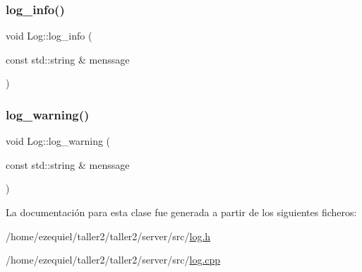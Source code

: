 \subsubsection{\texorpdfstring{log\+\_\+info()}{log\_info()}}
{\footnotesize\ttfamily void Log\+::log\+\_\+info (\begin{DoxyParamCaption}\item[{const std\+::string \&}]{menssage }\end{DoxyParamCaption})}

\mbox{\label{classLog_ac659fa24adce6d3ed79be5c6ab4248ca}} 
\subsubsection{\texorpdfstring{log\+\_\+warning()}{log\_warning()}}
{\footnotesize\ttfamily void Log\+::log\+\_\+warning (\begin{DoxyParamCaption}\item[{const std\+::string \&}]{menssage }\end{DoxyParamCaption})}



La documentación para esta clase fue generada a partir de los siguientes ficheros\+:\begin{DoxyCompactItemize}
\item 
/home/ezequiel/taller2/taller2/server/src/\hyperlink{log_8h}{log.\+h}\item 
/home/ezequiel/taller2/taller2/server/src/\hyperlink{log_8cpp}{log.\+cpp}\end{DoxyCompactItemize}
